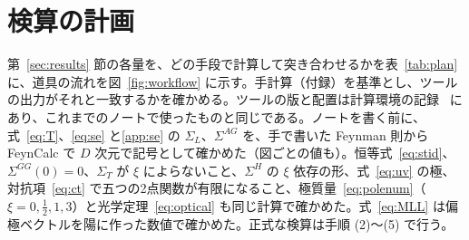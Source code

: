 \documentclass[a4paper,10pt]{ltjsarticle}
\begin{document}
\section{検算の計画}\label{sec:plan}

第~\ref{sec:results} 節の各量を、どの手段で計算して突き合わせるかを表~\ref{tab:plan} に、道具の流れを図~\ref{fig:workflow} に示す。手計算（付録）を基準とし、ツールの出力がそれと一致するかを確かめる。ツールの版と配置は計算環境の記録~\cite{env} にあり、これまでのノートで使ったものと同じである。ノートを書く前に、式~\eqref{eq:T}、\eqref{eq:se} と\ref{app:se} の $\Sigma_L$、$\Sigma^{AG}$ を、手で書いた Feynman 則から FeynCalc で $D$ 次元で記号として確かめた（図ごとの値も）。恒等式~\eqref{eq:stid}、$\Sigma^{GG}(0)=0$、$\Sigma_T$ が $\xi$ によらないこと、$\Sigma^H$ の $\xi$ 依存の形、式~\eqref{eq:uv} の極、対抗項~\eqref{eq:ct} で五つの2点関数が有限になること、極質量~\eqref{eq:polenum}（$\xi=0,\frac12,1,3$）と光学定理~\eqref{eq:optical} も同じ計算で確かめた。式~\eqref{eq:MLL} は偏極ベクトルを陽に作った数値で確かめた。正式な検算は手順 (2)〜(5) で行う。
\end{document}
